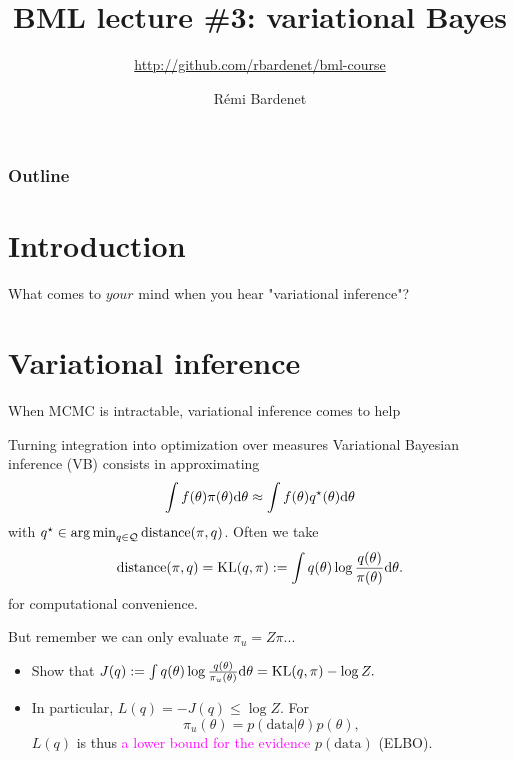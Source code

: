 \documentclass[10pt]{beamer}
\title[Bayesian ML: Bayesics]{BML lecture \#3: variational Bayes}
\subtitle{\url{http://github.com/rbardenet/bml-course}}
\author[Rémi Bardenet (CNRS \& Univ. Lille)] %
{Rémi Bardenet}
\institute[] %
{
  CNRS \& CRIStAL, Univ. Lille, France\\
\vspace{1cm}
\texttt{[image: /Users/rbardenet/Work/Tex/PosterImages/logoCNRS.pdf]}
\qquad \texttt{[image: /Users/rbardenet/Work/Tex/PosterImages/cristalLogo.pdf]}
}
\date{}
\newcommand\un[1]{\textcolor{magenta}{#1}}
\def\blank{\vspace{.5\textheight}}
\begin{document}
\begin{frame}
\maketitle
\end{frame}

\begin{frame}
\frametitle{Outline}
\tableofcontents
\end{frame}

\section{Introduction}

\begin{frame}{What comes to $your$ mind when you hear "variational inference"?}
\end{frame}

\section{Variational inference}
\begin{frame}{When MCMC is intractable, variational inference comes to help}
\begin{block}{Turning integration into optimization over measures}
  Variational Bayesian inference (VB) consists in approximating
  $$ 
    \int f(\theta)\pi(\theta){\rm d}\theta \approx \int f(\theta)q^\star(\theta){\rm d}\theta
  $$
  with \un{$ q^\star \in \operatorname*{arg\,min}_{q\in \mathcal Q} \text{distance}(\pi, q)$}. 
  Often we take
  $$
    \text{distance}(\pi, q) = \text{KL}( q, \pi) := \int q(\theta) \log \frac{q(\theta)}{\pi(\theta)}{\rm d}\theta.
  $$
  for computational convenience.
\end{block}
\blank
\end{frame}

\begin{frame}{But remember we can only evaluate $\pi_u = Z\pi$...}
\begin{itemize}
\item Show that $J(q) := \int q(\theta) \log \frac{q(\theta)}{\pi_u(\theta)}{\rm d}\theta = \text{KL}(q, \pi) - \log Z.$
\blank
\item In particular, $L(q) = -J(q) \leq \log Z$. For
$$
\pi_u(\theta) = p(\text{data}\vert\theta) p(\theta),
$$
$L(q)$ is thus \un{a lower bound for the evidence} $p(\text{data})$ (ELBO).
\end{itemize}
\end{frame}
\end{document}
